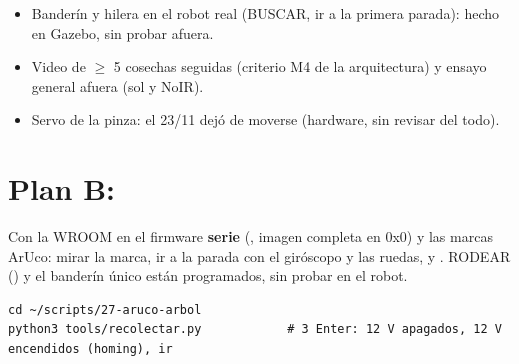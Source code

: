 \begin{pendiente}[Además]
\begin{itemize}[leftmargin=*]
  \item Banderín y hilera en el robot real (BUSCAR, ir a la primera parada): hecho en Gazebo, sin probar afuera.
  \item Video de $\ge$ 5 cosechas seguidas (criterio M4 de la arquitectura) y ensayo general afuera (sol y NoIR).
  \item Servo de la pinza: el 23/11 dejó de moverse (hardware, sin revisar del todo).
\end{itemize}
\end{pendiente}

\section{Plan B: }

Con la WROOM en el firmware \textbf{serie} (, imagen
completa en 0x0) y las marcas ArUco: mirar la marca, ir a la parada con el giróscopo y las ruedas, y
. RODEAR () y el banderín único están programados, sin probar en el robot.

\begin{lstlisting}[language=consola]
cd ~/scripts/27-aruco-arbol
python3 tools/recolectar.py            # 3 Enter: 12 V apagados, 12 V encendidos (homing), ir
\end{lstlisting}

